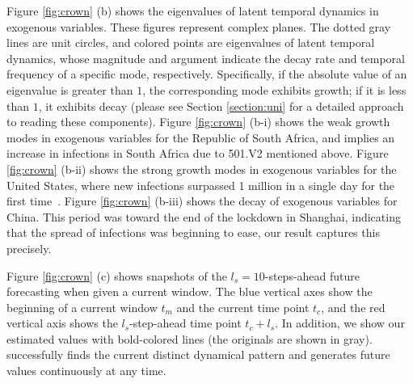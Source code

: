 Figure \ref{fig:crown} (b) shows the eigenvalues of latent temporal dynamics in exogenous variables.
These figures represent complex planes.
The dotted gray lines are unit circles, and
colored points are eigenvalues of latent temporal dynamics,
whose magnitude and argument indicate the decay rate and temporal frequency of a specific mode, respectively.
Specifically, if the absolute value of an eigenvalue is greater than $1$, the corresponding mode exhibits growth; if it is less than $1$, it exhibits decay
(please see Section \ref{section:uni} for a detailed approach to reading these components).
Figure \ref{fig:crown} (b-i) shows the weak growth modes in exogenous variables for the Republic of South Africa,
and implies an increase in infections in South Africa due to 501.V2 mentioned above.
Figure \ref{fig:crown} (b-ii) shows the strong growth modes in exogenous variables for the United States,
where new infections surpassed 1 million in a single day for the first time~\cite{covid19_america}.
Figure \ref{fig:crown} (b-iii) shows the decay of exogenous variables for China.
This period was toward the end of the lockdown in Shanghai, indicating that the spread of infections was beginning to ease,
our result captures this precisely.
\par
{}
Figure \ref{fig:crown} (c)
shows snapshots of
the $l_s = 10$-steps-ahead future forecasting
when given a current window.
The blue vertical axes show the beginning of a current window $t_m$ and
the current time point $t_c$,
and the red vertical axis shows the $l_s$-step-ahead time point $t_c+l_s$.
In addition, we show our estimated values with bold-colored lines
(the originals are shown in gray).
\method successfully finds the current distinct dynamical pattern and
generates future values continuously at any time.
